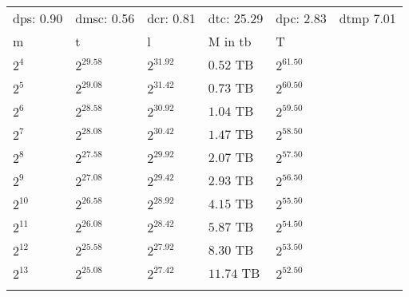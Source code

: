 \begin{tabular}{llllll}
dps: 0.90 & dmsc: 0.56 & dcr: 0.81 & dtc: 25.29 & dpc: 2.83 & dtmp 7.01 \\
m & t & l & M in tb & T \\
$2^{4}$ & $2^{29.58}$ & $2^{31.92}$ & $0.52$ TB & $2^{61.50}$ \\
$2^{5}$ & $2^{29.08}$ & $2^{31.42}$ & $0.73$ TB & $2^{60.50}$ \\
$2^{6}$ & $2^{28.58}$ & $2^{30.92}$ & $1.04$ TB & $2^{59.50}$ \\
$2^{7}$ & $2^{28.08}$ & $2^{30.42}$ & $1.47$ TB & $2^{58.50}$ \\
$2^{8}$ & $2^{27.58}$ & $2^{29.92}$ & $2.07$ TB & $2^{57.50}$ \\
$2^{9}$ & $2^{27.08}$ & $2^{29.42}$ & $2.93$ TB & $2^{56.50}$ \\
$2^{10}$ & $2^{26.58}$ & $2^{28.92}$ & $4.15$ TB & $2^{55.50}$ \\
$2^{11}$ & $2^{26.08}$ & $2^{28.42}$ & $5.87$ TB & $2^{54.50}$ \\
$2^{12}$ & $2^{25.58}$ & $2^{27.92}$ & $8.30$ TB & $2^{53.50}$ \\
$2^{13}$ & $2^{25.08}$ & $2^{27.42}$ & $11.74$ TB & $2^{52.50}$ \\
 &  &  &  &  &  \\
\end{tabular}
